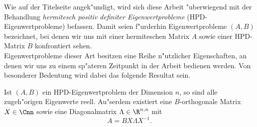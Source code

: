 Wie auf der Titelseite angek"undigt, wird sich diese Arbeit "uberwiegend mit der Behandlung \emph{hermitesch positiv definiter Eigenwertprobleme} (HPD-Eigenwertprobleme) befassen.
Damit seien f"urderhin Eigenwertprobleme $(A,B)$ bezeichnet, bei denen wir uns mit einer hermiteschen Matrix $A$ sowie einer HPD-Matrix $B$ konfrontiert sehen.\\

Eigenwertprobleme dieser Art besitzen eine Reihe n"utzlicher Eigenschaften, an denen wir uns zu einem sp"ateren Zeitpunkt in der Arbeit bedienen werden.
Von besonderer Bedeutung wird dabei das folgende Resultat sein.

\begin{thm}\label{thm:chap1:realEigenvalues}
Ist $(A,B)$ ein HPD-Eigenwertproblem der Dimension $n$, so sind alle zugeh"origen Eigenwerte reell.
Au"serdem existiert eine $B$-orthogonale Matrix $X\in\Cnn$ sowie eine Diagonalmatrix $\Lambda\in\R^{n,n}$ mit
\begin{equation}\label{eq:chap1:evpMatrix}
A = BX\Lambda X^{-1}.
\end{equation}
\end{thm}

